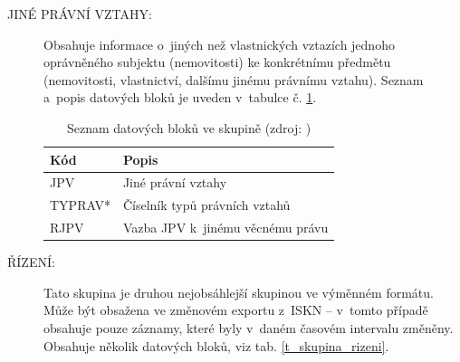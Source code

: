 \documentclass[a4paper,12pt,oneside]{book}
\begin{document}
\begin{description}
\item[JINÉ PRÁVNÍ VZTAHY:] Obsahuje informace o~jiných než
  vlastnických vztazích jednoho oprávněného subjektu (nemovitosti) ke
  konkrétnímu předmětu (nemovitosti, vlastnictví, dalšímu jinému
  právnímu vztahu). Seznam a~popis datových bloků je uveden v~tabulce
  č. \ref{t_skupina_jpv}. \cite{dp_landa}
 
\begin{table}[htbp]
\centering
\caption[Seznam datových bloků ve skupině ]{Seznam datových bloků ve skupině  (zdroj: \cite{vfk_struktura})}
\begin{tabular}{ll}
\toprule
\textbf{Kód} & \textbf{Popis} \\ 
\midrule
JPV & Jiné právní vztahy \\ 
TYPRAV* & Číselník typů právních vztahů \\ 
RJPV & Vazba JPV k~jinému věcnému právu \\ 
\bottomrule
\end{tabular}
\label{t_skupina_jpv}
\end{table}

\item[ŘÍZENÍ:] Tato skupina je druhou nejobsáhlejší skupinou ve
  výměnném formátu. Může být obsažena ve změnovém exportu z~ISKN --
  v~tomto případě obsahuje pouze záznamy, které byly v~daném časovém
  intervalu změněny. Obsahuje několik datových bloků, viz
  tab. \ref{t_skupina_rizeni}. \cite{dp_landa}
 

\end{description}
\end{document}
